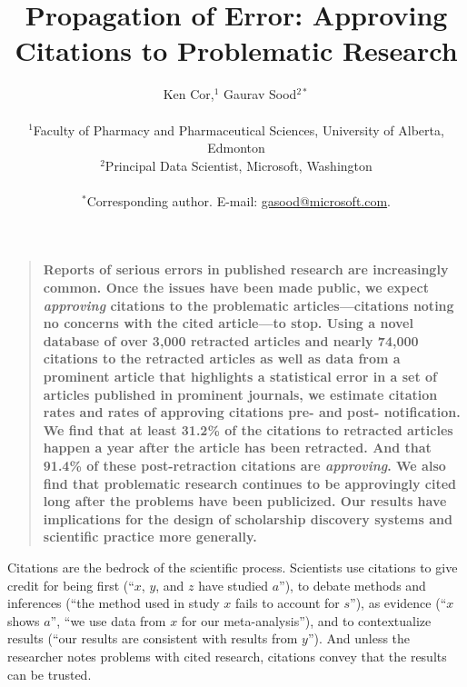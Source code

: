\documentclass[12pt]{article}
\newenvironment{sciabstract}{%
\begin{quote} \bf}
{\end{quote}}
\begin{document}
\title{Propagation of Error: Approving Citations to Problematic Research} 

\author
{Ken Cor,$^{1}$ Gaurav Sood$^{2\ast}$\\
\\
\normalsize{$^{1}$Faculty of Pharmacy and Pharmaceutical Sciences, University of Alberta, Edmonton}\\
\normalsize{$^{2}$Principal Data Scientist, Microsoft, Washington}\\
\\
\normalsize{$^\ast$Corresponding author. E-mail: \url{gasood@microsoft.com}.}
}

\date{}


\baselineskip24pt


\maketitle 

\begin{sciabstract}
Reports of serious errors in published research are increasingly common. Once the issues have been made public, we expect \textit{approving} citations to the problematic articles---citations noting no concerns with the cited article---to stop. Using a novel database of over 3,000 retracted articles and nearly 74,000 citations to the retracted articles as well as data from a prominent article that highlights a statistical error in a set of articles published in prominent journals, we estimate citation rates and rates of approving citations pre- and post- notification. We find that at least 31.2\% of the citations to retracted articles happen a year after the article has been retracted. And that 91.4\% of these post-retraction citations are \textit{approving}. We also find that problematic research continues to be approvingly cited long after the problems have been publicized. Our results have implications for the design of scholarship discovery systems and scientific practice more generally.
\end{sciabstract}

\clearpage

Citations are the bedrock of the scientific process. Scientists use citations to give credit for being first (``$x$, $y$, and $z$ have studied $a$''), to debate methods and inferences (``the method used in study $x$ fails to account for $s$''), as evidence (``$x$ shows $a$'', ``we use data from $x$ for our meta-analysis''), and to contextualize results (``our results are consistent with results from $y$''). And unless the researcher notes problems with cited research, citations convey that the results can be trusted.
\end{document}
